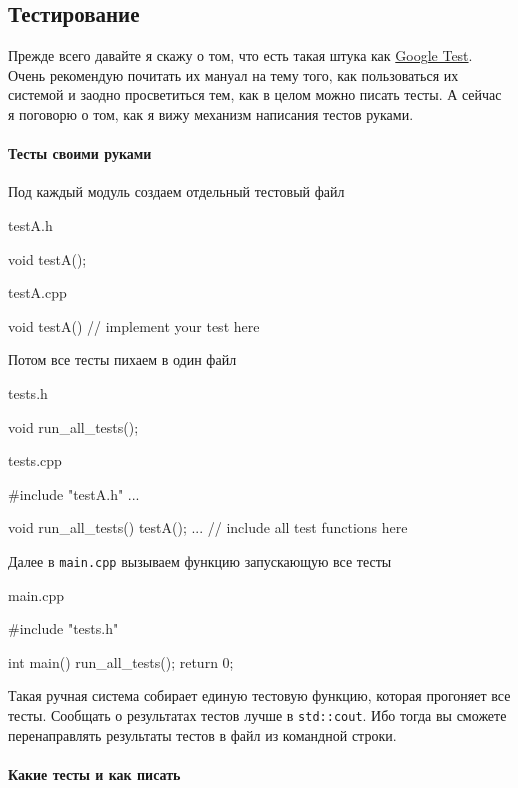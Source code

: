 \documentclass{article}
\begin{document}
\subsection{Тестирование}

Прежде всего давайте я скажу о том, что есть такая штука как \href{https://github.com/google/googletest}{Google Test}. Очень рекомендую почитать их мануал на тему того, как пользоваться их системой и заодно просветиться тем, как в целом можно писать тесты. А сейчас я поговорю о том, как я вижу механизм написания тестов руками.

\paragraph{Тесты своими руками}

Под каждый модуль создаем отдельный тестовый файл
\begin{cppcode}
testA.h

void testA();

testA.cpp

void testA() {
  // implement your test here
}
\end{cppcode}
Потом все тесты пихаем в один файл
\begin{cppcode}
tests.h

void run_all_tests();

tests.cpp

#include "testA.h"
...

void run_all_tests() {
  testA();
  ... // include all test functions here
}
\end{cppcode}
Далее в \verb"main.cpp" вызываем функцию запускающую все тесты
\begin{cppcode}
main.cpp

#include "tests.h"

int main() {
  run_all_tests();
  return 0;
}
\end{cppcode}
Такая ручная система собирает единую тестовую функцию, которая прогоняет все тесты. Сообщать о результатах тестов лучше в \verb"std::cout". Ибо тогда вы сможете перенаправлять результаты тестов в файл из командной строки.

\paragraph{Какие тесты и как писать}
\end{document}
